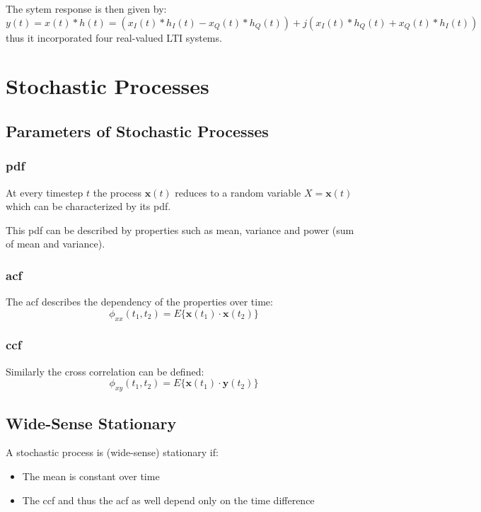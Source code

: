 The sytem response is then given by:
\begin{equation}
    y(t) = x(t) * h(t) =
        (x_I(t) * h_I(t) - x_Q(t) * h_Q(t)) + j(x_I(t) * h_Q(t) + x_Q(t) * h_I(t))
\end{equation}
thus it incorporated four real-valued LTI systems.

\section{Stochastic Processes}
\subsection{Parameters of Stochastic Processes}
\subsubsection{\acl{pdf}}
At every timestep $t$ the process $\mathbf{x}(t)$ reduces to a random variable
$X=\mathbf{x}(t)$ which can be characterized by its \ac{pdf}.

This \ac{pdf} can be described by properties such as mean, variance and power (sum
of mean and variance).

\subsubsection{\acl{acf}}
The \ac{acf} describes the dependency of the properties over time:
\begin{equation}
    \phi_{xx} (t_1, t_2) = E\{\mathbf{x}(t_1) \cdot \mathbf{x}(t_2)\}
\end{equation}

\subsubsection{\acl{ccf}}
Similarly the cross correlation can be defined:
\begin{equation}
    \phi_{xy} (t_1, t_2) = E\{\mathbf{x}(t_1) \cdot \mathbf{y}(t_2)\}
\end{equation}

\subsection{Wide-Sense Stationary}
A stochastic process is (wide-sense) stationary if:
\begin{itemize}
    \item The mean is constant over time
    \item The \ac{ccf} and thus the \ac{acf} as well depend only on the time difference
\end{itemize}

